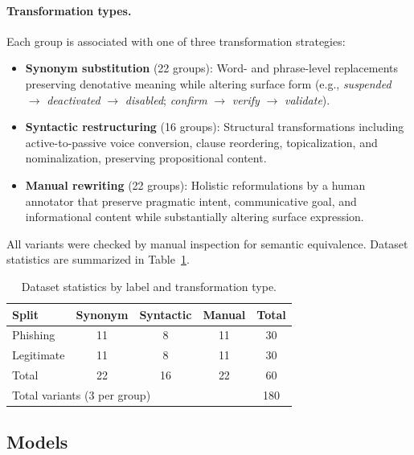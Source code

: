 \documentclass[11pt]{article}
\begin{document}
\paragraph{Transformation types.} Each group is associated with one of three transformation strategies:
\begin{itemize}[leftmargin=*, itemsep=3pt]
  \item \textbf{Synonym substitution} (22 groups): Word- and phrase-level replacements preserving denotative meaning while altering surface form (e.g., \textit{suspended} $\rightarrow$ \textit{deactivated} $\rightarrow$ \textit{disabled}; \textit{confirm} $\rightarrow$ \textit{verify} $\rightarrow$ \textit{validate}).
  \item \textbf{Syntactic restructuring} (16 groups): Structural transformations including active-to-passive voice conversion, clause reordering, topicalization, and nominalization, preserving propositional content.
  \item \textbf{Manual rewriting} (22 groups): Holistic reformulations by a human annotator that preserve pragmatic intent, communicative goal, and informational content while substantially altering surface expression.
\end{itemize}

All variants were checked by manual inspection for semantic equivalence. Dataset statistics are summarized in Table~\ref{tab:dataset}.

\begin{table}[h]
\centering
\small
\caption{Dataset statistics by label and transformation type.}
\label{tab:dataset}
\setlength{\tabcolsep}{10pt}
\begin{tabular}{lcccc}
\toprule
\textbf{Split} & \textbf{Synonym} & \textbf{Syntactic} & \textbf{Manual} & \textbf{Total} \\
\midrule
Phishing   & 11 & 8 & 11 & 30 \\
Legitimate & 11 & 8 & 11 & 30 \\
\midrule
Total      & 22 & 16 & 22 & 60 \\
\midrule
\multicolumn{4}{l}{Total variants (3 per group)} & 180 \\
\bottomrule
\end{tabular}
\end{table}

\subsection{Models}
\end{document}
